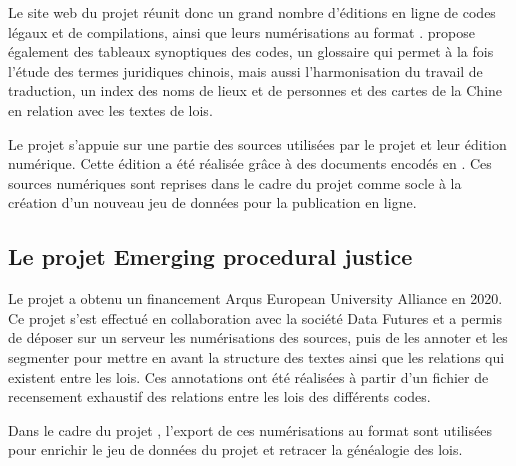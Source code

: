 Le site web du projet \LSC réunit donc un grand nombre d'éditions en ligne de codes légaux et de compilations, ainsi que leurs numérisations au format \pdf. \LSC propose également des tableaux synoptiques des codes, un glossaire qui permet à la fois l'étude des termes juridiques chinois, mais aussi l'harmonisation du travail de traduction, un index des noms de lieux et de personnes et des cartes de la Chine en relation avec les textes de lois. 

Le projet \COREL s'appuie sur une partie des sources utilisées par le projet \LSC et leur édition numérique. Cette édition a été réalisée grâce à des documents encodés en \XML. Ces sources numériques sont reprises dans le cadre du projet \COREL comme socle à la création d'un nouveau jeu de données pour la publication en ligne. 

\subsection{Le projet Emerging procedural justice}
Le projet \EPJ a obtenu un financement Arqus European University Alliance en 2020. Ce projet s'est effectué en collaboration avec la société Data Futures et a permis de déposer sur un serveur \IIIF les numérisations des sources, puis de les annoter et les segmenter pour mettre en avant la structure des textes ainsi que les relations qui existent entre les lois. Ces annotations ont été réalisées à partir d'un fichier de recensement exhaustif des relations entre les lois des différents codes. 

Dans le cadre du projet \COREL, l'export de ces numérisations au format \JSON sont utilisées pour enrichir le jeu de données du projet et retracer la généalogie des lois.  
